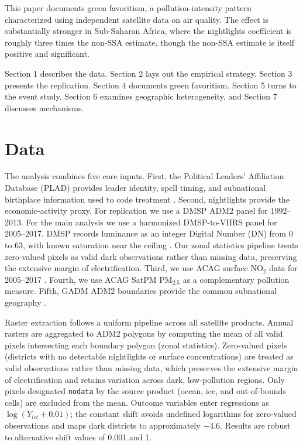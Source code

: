 \documentclass[9pt,twocolumn,twoside]{pnas-new}
\providecommand{\Endparasplit}{}
\begin{document}
This paper documents green favoritism, a pollution-intensity pattern characterized using independent satellite data on air quality. The effect is substantially stronger in Sub-Saharan Africa, where the nightlights coefficient is roughly three times the non-SSA estimate, though the non-SSA estimate is itself positive and significant.

Section 1 describes the data. Section 2 lays out the empirical strategy. Section 3 presents the replication. Section 4 documents green favoritism. Section 5 turns to the event study. Section 6 examines geographic heterogeneity, and Section 7 discusses mechanisms.\Endparasplit

\section{Data}

The analysis combines five core inputs. First, the Political Leaders' Affiliation Database (PLAD) provides leader identity, spell timing, and subnational birthplace information used to code treatment \cite{Bomprezzi2025PLAD}. Second, nightlights provide the economic-activity proxy. For replication we use a DMSP ADM2 panel for 1992--2013. For the main analysis we use a harmonized DMSP-to-VIIRS panel for 2005--2017. DMSP records luminance as an integer Digital Number (DN) from 0 to 63, with known saturation near the ceiling \cite{Gibson2021}. Our zonal statistics pipeline treats zero-valued pixels as valid dark observations rather than missing data, preserving the extensive margin of electrification. Third, we use ACAG surface NO$_2$ data for 2005--2017 \cite{Cooper2022NO2}. Fourth, we use ACAG SatPM PM$_{2.5}$ as a complementary pollution measure. Fifth, GADM ADM2 boundaries provide the common subnational geography \cite{GADM2022}.

Raster extraction follows a uniform pipeline across all satellite products. Annual rasters are aggregated to ADM2 polygons by computing the mean of all valid pixels intersecting each boundary polygon (zonal statistics). Zero-valued pixels (districts with no detectable nightlights or surface concentrations) are treated as valid observations rather than missing data, which preserves the extensive margin of electrification and retains variation across dark, low-pollution regions. Only pixels designated \texttt{nodata} by the source product (ocean, ice, and out-of-bounds cells) are excluded from the mean. Outcome variables enter regressions as $\log(Y_{ict} + 0.01)$; the constant shift avoids undefined logarithms for zero-valued observations and maps dark districts to approximately $-4.6$. Results are robust to alternative shift values of 0.001 and 1.
\end{document}
